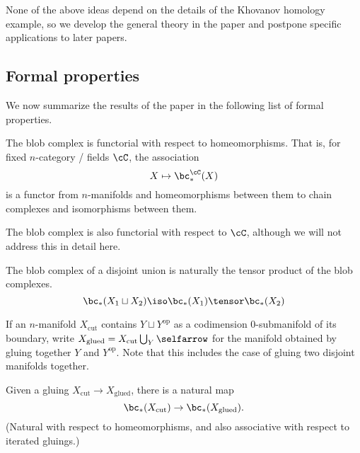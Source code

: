 None of the above ideas depend on the details of the Khovanov homology example,
so we develop the general theory in the paper and postpone specific applications
to later papers.



\subsection{Formal properties}
\label{sec:properties}
We now summarize the results of the paper in the following list of formal properties.

\begin{property}[Functoriality]
\label{property:functoriality}%
The blob complex is functorial with respect to homeomorphisms. That is, 
for fixed $n$-category / fields $\cC$, the association
\begin{equation*}
X \mapsto \bc_*^{\cC}(X)
\end{equation*}
is a functor from $n$-manifolds and homeomorphisms between them to chain complexes and isomorphisms between them.
\end{property}

The blob complex is also functorial with respect to $\cC$, although we will not address this in detail here.

\begin{property}
\label{property:disjoint-union}
The blob complex of a disjoint union is naturally the tensor product of the blob complexes.
\begin{equation*}
\bc_*(X_1 \du X_2) \iso \bc_*(X_1) \tensor \bc_*(X_2)
\end{equation*}
\end{property}

If an $n$-manifold $X_\text{cut}$ contains $Y \sqcup Y^\text{op}$ as a codimension $0$-submanifold of its boundary, write $X_\text{glued} = X_\text{cut} \bigcup_{Y}\selfarrow$ for the manifold obtained by gluing together $Y$ and $Y^\text{op}$. Note that this includes the case of gluing two disjoint manifolds together.
\begin{property}
\label{property:gluing-map}%
Given a gluing $X_\mathrm{cut} \to X_\mathrm{glued}$, there is
a natural map
\[
	\bc_*(X_\mathrm{cut}) \to \bc_*(X_\mathrm{glued}) .
\]
(Natural with respect to homeomorphisms, and also associative with respect to iterated gluings.)
\end{property}

